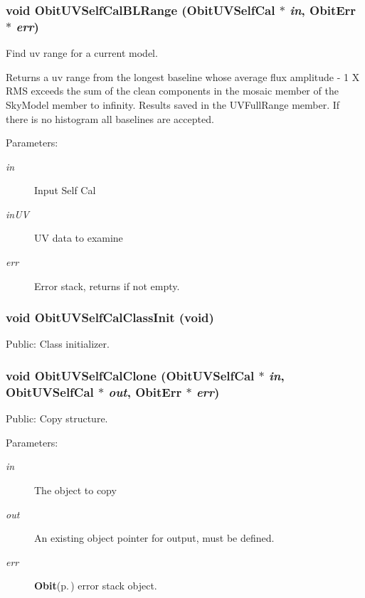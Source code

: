 \subsubsection{\setlength{\rightskip}{0pt plus 5cm}void Obit\-UVSelf\-Cal\-BLRange ({\bf Obit\-UVSelf\-Cal} $\ast$ {\em in}, {\bf Obit\-Err} $\ast$ {\em err})}\label{ObitUVSelfCal_8h_a13}


Find uv range for a current model. 

Returns a uv range from the longest baseline whose average flux amplitude - 1 X RMS exceeds the sum of the clean components in the mosaic member of the Sky\-Model member to infinity. Results saved in the UVFull\-Range member. If there is no histogram all baselines are accepted. \begin{Desc}
\item[Parameters:]
\begin{description}
\item[{\em in}]Input Self Cal \item[{\em in\-UV}]UV data to examine \item[{\em err}]Error stack, returns if not empty. \end{description}
\end{Desc}
\subsubsection{\setlength{\rightskip}{0pt plus 5cm}void Obit\-UVSelf\-Cal\-Class\-Init (void)}\label{ObitUVSelfCal_8h_a4}


Public: Class initializer. 

\subsubsection{\setlength{\rightskip}{0pt plus 5cm}void Obit\-UVSelf\-Cal\-Clone ({\bf Obit\-UVSelf\-Cal} $\ast$ {\em in}, {\bf Obit\-UVSelf\-Cal} $\ast$ {\em out}, {\bf Obit\-Err} $\ast$ {\em err})}\label{ObitUVSelfCal_8h_a9}


Public: Copy structure. 

\begin{Desc}
\item[Parameters:]
\begin{description}
\item[{\em in}]The object to copy \item[{\em out}]An existing object pointer for output, must be defined. \item[{\em err}]{\bf Obit}{\rm (p.\,\pageref{structObit})} error stack object. \end{description}
\end{Desc}
